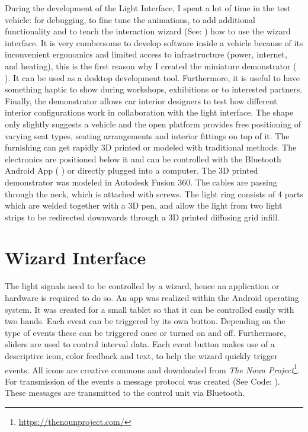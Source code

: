 During the development of the Light Interface, I spent a lot of time in the test vehicle: for debugging, to fine tune the animations, to add additional functionality and to teach the interaction wizard (See: \emph{}) how to use the wizard interface. It is very cumbersome to develop software inside a vehicle because of its inconvenient ergonomics and limited access to infrastructure (power, internet, and heating), this is the first reason why I created the miniature demonstrator ( \emph{}). It can be used as a desktop development tool. Furthermore, it is useful to have something haptic to show during workshops, exhibitions or to interested partners. Finally, the demonstrator allows car interior designers to test how different interior configurations work in collaboration with the light interface. The shape only slightly suggests a vehicle and the open platform provides free positioning of varying seat types, seating arrangements and interior fittings on top of it. The furnishing can get rapidly 3D printed or modeled with traditional methods. The electronics are positioned below it and can be controlled with the Bluetooth Android App ( \emph{}) or directly plugged into a computer. The 3D printed demonstrator was modeled in Autodesk Fusion 360. The cables are passing through the neck, which is attached with screws. The light ring consists of 4 parts which are welded together with a 3D pen, and allow the light from two light strips to be redirected downwards through a 3D printed diffusing grid infill. 


\section{Wizard Interface}
\label{sec:wizard}
The light signals need to be controlled by a wizard, hence an application or hardware is required to do so. An app was realized within the Android operating system. It was created for a small tablet so that it can be controlled easily with two hands. Each event can be triggered by its own button. Depending on the type of events these can be triggered once or turned on and off. Furthermore, sliders are used to control interval data. Each event button makes use of a descriptive icon, color feedback and text, to help the wizard quickly trigger events. All icons are creative commons and downloaded from \emph{The Noun Project}\footnote{\url{https://thenounproject.com/}}. For transmission of the events a message protocol was created (See Code: \emph{}). These messages are transmitted to the control unit via Bluetooth. 

